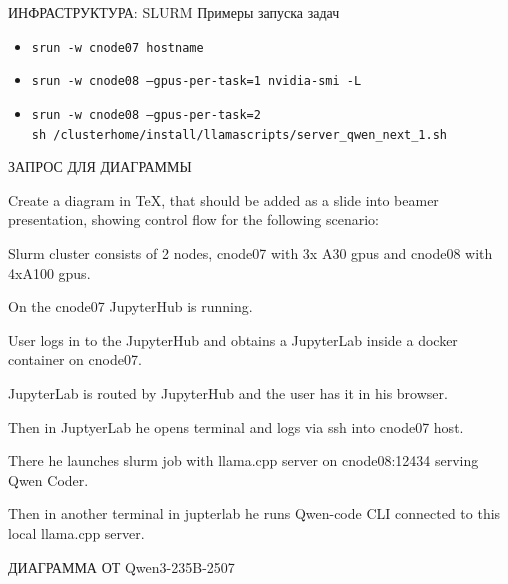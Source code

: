 \documentclass[aspectratio=169]{beamer}
\begin{document}
{\begin{frame}{ИНФРАСТРУКТУРА: SLURM}
		\bigskip
		{Примеры запуска задач}
		\begin{itemize}
			\item [-] \texttt{srun -w cnode07 hostname}
			\item [-] \texttt{srun -w cnode08 --gpus-per-task=1 nvidia-smi -L}
			\item [-] \texttt{srun -w cnode08 --gpus-per-task=2 \hspace{0.5mm} \\[-1mm]
				\hspace{1cm} sh /clusterhome/install/llamascripts/server\_qwen\_next\_1.sh}
		\end{itemize}
	\end{frame}

	\begin{frame}{ЗАПРОС ДЛЯ ДИАГРАММЫ}
		\begin{minipage}{\textwidth}
		\small
		Create a diagram in TeX, that should be added as a slide into beamer presentation, showing control flow for the following scenario:
		
		Slurm cluster consists of 2 nodes, cnode07 with 3x A30 gpus and cnode08 with 4xA100 gpus.
		
		On the cnode07 JupyterHub is running.
		
		User logs in to the JupyterHub and obtains a JupyterLab inside a docker container on cnode07. 
		
		JupyterLab is routed by JupyterHub and the user has it in his browser.
		
		Then in JuptyerLab he opens terminal and logs via ssh into cnode07 host.
		
		There he launches slurm job with llama.cpp server on cnode08:12434 serving Qwen Coder.
		
		Then in another terminal in jupterlab he runs Qwen-code CLI connected to this local llama.cpp server.
		\end{minipage}
	\end{frame}


	\begin{frame}{ДИАГРАММА ОТ Qwen3-235B-2507}
	\centering
	\begin{tikzpicture}[
		node distance=8mm,
		box/.style={draw, rounded corners, inner sep=6pt},
		service/.style={box, minimum height=12mm, text width=3.5cm, align=center},
		terminal/.style={box, draw=jupyter, text width=2.8cm, font=\ttfamily\small},
		ssh/.style={->, >=stealth, thick, orange, dashed},
		slurmjob/.style={->, >=stealth, thick, slurm, line width=1.5pt},
		browser/.style={circle, draw=jupyter, minimum size=8mm}
		]
		

\end{tikzpicture}
\end{frame}}
\end{document}

